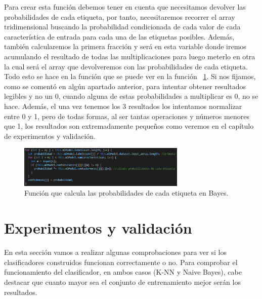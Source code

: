 \documentclass[a4paper, 12pt]{book}
\begin{document}
Para crear esta función debemos tener en cuenta que necesitamos devolver las probabilidades de cada etiqueta, por tanto, necesitaremos recorrer el array tridimensional buscando la probabilidad condicionada de cada valor de cada característica de entrada para cada una de las etiquetas posibles. Además, también calcularemos la primera fracción y será en esta variable donde iremos acumulando el resultado de todas las multiplicaciones para luego meterlo en otra la cual será el array que devolveremos con las probabilidades de cada etiqueta. Todo esto se hace en la función que se puede ver en la función ~\ref{fig:probabilidadesetiquetasbayes}. Si nos fijamos, como se comentó en algún apartado anterior, para intentar obtener resultados legibles y no un 0, cuando alguna de estas probabilidades a multiplicar es 0, no se hace. Además, el una vez tenemos los 3 resultados los intentamos normalizar entre 0 y 1, pero de todas formas, al ser tantas operaciones y números menores que 1, los resultados son extremadamente pequeños como veremos en el capítulo de experimentos y validación.

\begin{figure}
	\centering
	\includegraphics[width=8cm, keepaspectratio]{img/probabilidadesetiquetasbayes}
	\caption{Función que calcula las probabilidades de cada etiqueta en Bayes.}			
	\label{fig:probabilidadesetiquetasbayes}
\end{figure}




\cleardoublepage
\chapter{Experimentos y validación}

En esta sección vamos a realizar algunas comprobaciones para ver si los clasificadores construidos funcionan correctamente o no. Para comprobar el funcionamiento del clasificador, en ambos casos (K-NN y Naive Bayes), cabe destacar que cuanto mayor sea el conjunto de entrenamiento mejor serán los resultados.
\end{document}
